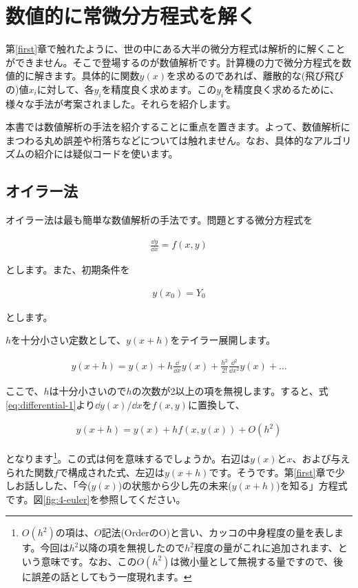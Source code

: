 \chapter{数値的に常微分方程式を解く}
\label{numerical-ordinary}
第\ref{first}章で触れたように、世の中にある大半の微分方程式は解析的に解くことができません。そこで登場するのが数値解析です。計算機の力で微分方程式を数値的に解きます。具体的に関数$y(x)$を求めるのであれば、離散的な(飛び飛びの)値$x_i$に対して、各$y_i$を精度良く求めます。この$y_i$を精度良く求めるために、様々な手法が考案されました。それらを紹介します。

本書では数値解析の手法を紹介することに重点を置きます。よって、数値解析にまつわる丸め誤差や桁落ちなどについては触れません。なお、具体的なアルゴリズムの紹介には疑似コードを使います。






\section{オイラー法}
\label{euler-numerical}
オイラー法は最も簡単な数値解析の手法です。問題とする微分方程式を

\begin{eqnarray}
    \frac{\dd y}{\dd x}=f(x,y)
    \label{eq:differential-1}
\end{eqnarray}

\noindent
とします。また、初期条件を

\begin{eqnarray}
    y(x_0)=Y_0
    \label{eq:terms-1}
\end{eqnarray}

\noindent
とします。

$h$を十分小さい定数として、$y(x+h)$をテイラー展開します。

\begin{eqnarray}
    y(x+h)=y(x)+h\frac{\dd}{\dd x}y(x)+\frac{h^2}{2!}\frac{\dd^2}{\dd x^2}y(x)+\dots
    \label{eq:taylor}
\end{eqnarray}

ここで、$h$は十分小さいので$h$の次数が2以上の項を無視します。すると、式\ref{eq:differential-1}より$\dd y(x)/\dd x$を$f(x,y)$に置換して、

\begin{eqnarray}
    y(x+h)=y(x)+hf(x,y(x))+O(h^2)
\end{eqnarray}

\noindent
となります\footnote{$O(h^2)の項は、$$O$記法(OrderのO)と言い、カッコの中身程度の量を表します。今回は$h^2$以降の項を無視したので$h^2$程度の量がこれに追加されます、という意味です。なお、この$O(h^2)$は微小量として無視する量ですので、後に誤差の話としてもう一度現れます。}。この式は何を意味するでしょうか。右辺は$y(x)$と$x$、および与えられた関数$f$で構成された式、左辺は$y(x+h)$です。そうです。第\ref{first}章で少しお話しした、「今($y(x)$)の状態から少し先の未来($y(x+h)$)を知る」方程式です。図\ref{fig:4-euler}を参照してください。


